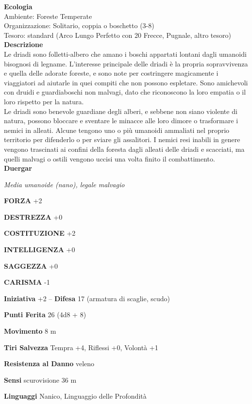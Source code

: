 \begin{multicols}{2}
\textbf{Ecologia}\\
Ambiente: Foreste Temperate\\
Organizzazione: Solitario, coppia o boschetto (3-8)\\
Tesoro: standard (Arco Lungo Perfetto con 20 Frecce, Pugnale, altro tesoro)\\
\textbf{Descrizione}\\
Le driadi sono folletti-albero che amano i boschi appartati lontani dagli umanoidi bisognosi di legname. L'interesse principale delle driadi è la propria sopravvivenza e quella delle adorate foreste, e sono note per costringere magicamente i viaggiatori ad aiutarle in quei compiti che non possono espletare. Sono amichevoli con druidi e guardiaboschi non malvagi, dato che riconoscono la loro empatia o il loro rispetto per la natura.\\
Le driadi sono benevole guardiane degli alberi, e sebbene non siano violente di natura, possono bloccare e sventare le minacce alle loro dimore o trasformare i nemici in alleati. Alcune tengono uno o più umanoidi ammaliati nel proprio territorio per difenderlo o per sviare gli assalitori. I nemici resi inabili in genere vengono trascinati ai confini della foresta dagli alleati delle driadi e scacciati, ma quelli malvagi o ostili vengono uccisi una volta finito il combattimento.\\


\medskip{}\textbf{Duergar}

\emph{Media umanoide (nano), legale malvagio}

\textbf{FORZA} +2

\textbf{DESTREZZA} +0

\textbf{COSTITUZIONE} +2

\textbf{INTELLIGENZA} +0

\textbf{SAGGEZZA} +0

\textbf{CARISMA} -1

\textbf{Iniziativa} +2 -- \textbf{Difesa} 17 (armatura di scaglie, scudo)

\textbf{Punti Ferita} 26 (4d8 + 8)

\textbf{Movimento} 8 m

\textbf{Tiri Salvezza} Tempra +4, Riflessi +0, Volontà +1

\textbf{Resistenza al Danno} veleno

\textbf{Sensi} scurovisione 36 m

\textbf{Linguaggi} Nanico, Linguaggio delle Profondità 


\end{multicols}
